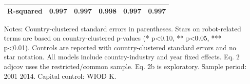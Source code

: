 \begin{table}[!htbp]
\begin{threeparttable}
\begin{tabular}{lccccc}
R-squared & 0.997 & 0.997 & 0.998 & 0.997 & 0.997 \\
\bottomrule
\end{tabular}
\begin{tablenotes}[flushleft]
\footnotesize
\item Notes: Country-clustered standard errors in parentheses. Stars on robot-related terms are based on country-clustered p-values (* p<0.10, ** p<0.05, *** p<0.01). Controls are reported with country-clustered standard errors and no star notation. All models include country-industry and year fixed effects. Eq. 2 adjcov uses the restricted/common sample. Eq. 2b is exploratory. Sample period: 2001-2014. Capital control: WIOD K.
\end{tablenotes}
\end{threeparttable}
\end{table}
